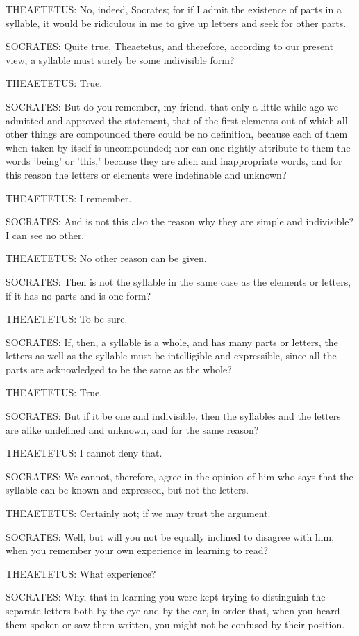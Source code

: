 THEAETETUS: No, indeed, Socrates; for if I admit the existence of parts
in a syllable, it would be ridiculous in me to give up letters and seek
for other parts.

SOCRATES: Quite true, Theaetetus, and therefore, according to our
present view, a syllable must surely be some indivisible form?

THEAETETUS: True.

SOCRATES: But do you remember, my friend, that only a little while ago
we admitted and approved the statement, that of the first elements out
of which all other things are compounded there could be no definition,
because each of them when taken by itself is uncompounded; nor can one
rightly attribute to them the words 'being' or 'this,' because they
are alien and inappropriate words, and for this reason the letters or
elements were indefinable and unknown?

THEAETETUS: I remember.

SOCRATES: And is not this also the reason why they are simple and
indivisible? I can see no other.

THEAETETUS: No other reason can be given.

SOCRATES: Then is not the syllable in the same case as the elements or
letters, if it has no parts and is one form?

THEAETETUS: To be sure.

SOCRATES: If, then, a syllable is a whole, and has many parts or
letters, the letters as well as the syllable must be intelligible and
expressible, since all the parts are acknowledged to be the same as the
whole?

THEAETETUS: True.

SOCRATES: But if it be one and indivisible, then the syllables and the
letters are alike undefined and unknown, and for the same reason?

THEAETETUS: I cannot deny that.

SOCRATES: We cannot, therefore, agree in the opinion of him who says
that the syllable can be known and expressed, but not the letters.

THEAETETUS: Certainly not; if we may trust the argument.

SOCRATES: Well, but will you not be equally inclined to disagree with
him, when you remember your own experience in learning to read?

THEAETETUS: What experience?

SOCRATES: Why, that in learning you were kept trying to distinguish the
separate letters both by the eye and by the ear, in order that, when
you heard them spoken or saw them written, you might not be confused by
their position.

